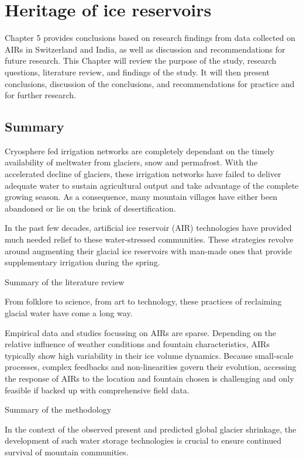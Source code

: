 \chapter{Heritage of ice reservoirs}

Chapter 5 provides conclusions based on research findings from data collected on AIRs in Switzerland and India,
as well as discussion and recommendations for future research. This Chapter will review the purpose of the
study, research questions, literature review, and findings of the study. It will then present conclusions,
discussion of the conclusions, and recommendations for practice and for further research.

\section{Summary}

Cryosphere fed irrigation networks are completely dependant on the timely availability of meltwater from
glaciers, snow and permafrost. With the accelerated decline of glaciers, these irrigation networks have failed
to deliver adequate water to sustain agricultural output and take advantage of the complete growing season. As a
consequence, many mountain villages have either been abandoned or lie on the brink of desertification.

In the past few decades, artificial ice reservoir (AIR) technologies have provided much needed relief to these
water-stressed communities. These strategies revolve around augmenting their glacial ice reservoirs with
man-made ones that provide supplementary irrigation during the spring. 

Summary of the literature review

From folklore to science, from art to technology, these practices of reclaiming glacial water have come a long
way. 

Empirical data and studies focussing on AIRs are sparse. Depending on the relative influence of weather
conditions and fountain characteristics, AIRs typically show high variability in their ice volume dynamics.
Because small-scale processes, complex feedbacks and non-linearities govern their evolution, accessing the
response of AIRs to the location and fountain chosen is challenging and only feasible if backed up with
comprehensive field data. 

Summary of the methodology

In the context of the observed present and predicted global glacier shrinkage, the development of such water
storage technologies is crucial to ensure continued survival of mountain communities.

